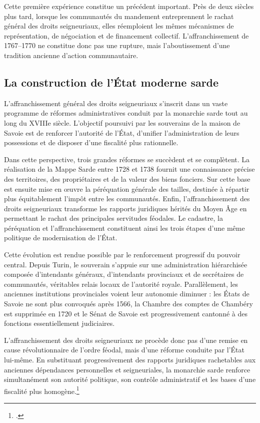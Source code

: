 \documentclass[12pt,a4paper]{report}
\begin{document}
Cette première expérience constitue un précédent important. Près de deux siècles plus tard, lorsque les communautés du mandement entreprennent le rachat général des droits seigneuriaux, elles réemploient les mêmes mécanismes de représentation, de négociation et de financement collectif. L'affranchissement de 1767--1770 ne constitue donc pas une rupture, mais l'aboutissement d'une tradition ancienne d'action communautaire.



\subsection{La construction de l'État moderne sarde}

L'affranchissement général des droits seigneuriaux s'inscrit dans un vaste programme de réformes administratives conduit par la monarchie sarde tout au long du XVIIIe siècle. L'objectif poursuivi par les souverains de la maison de Savoie est de renforcer l'autorité de l'État, d'unifier l'administration de leurs possessions et de disposer d'une fiscalité plus rationnelle.

Dans cette perspective, trois grandes réformes se succèdent et se complètent. La réalisation de la Mappe Sarde entre 1728 et 1738 fournit une connaissance précise des territoires, des propriétaires et de la valeur des biens fonciers. Sur cette base est ensuite mise en œuvre la péréquation générale des tailles, destinée à répartir plus équitablement l'impôt entre les communautés. Enfin, l'affranchissement des droits seigneuriaux transforme les rapports juridiques hérités du Moyen Âge en permettant le rachat des principales servitudes féodales. Le cadastre, la péréquation et l'affranchissement constituent ainsi les trois étapes d'une même politique de modernisation de l'État.

Cette évolution est rendue possible par le renforcement progressif du pouvoir central. Depuis Turin, le souverain s'appuie sur une administration hiérarchisée composée d'intendants généraux, d'intendants provinciaux et de secrétaires de communautés, véritables relais locaux de l'autorité royale. Parallèlement, les anciennes institutions provinciales voient leur autonomie diminuer : les États de Savoie ne sont plus convoqués après 1566, la Chambre des comptes de Chambéry est supprimée en 1720 et le Sénat de Savoie est progressivement cantonné à des fonctions essentiellement judiciaires.

L'affranchissement des droits seigneuriaux ne procède donc pas d'une remise en cause révolutionnaire de l'ordre féodal, mais d'une réforme conduite par l'État lui-même. En substituant progressivement des rapports juridiques rachetables aux anciennes dépendances personnelles et seigneuriales, la monarchie sarde renforce simultanément son autorité politique, son contrôle administratif et les bases d'une fiscalité plus homogène.\footcite{Bruchet1908Abolition}
\end{document}
